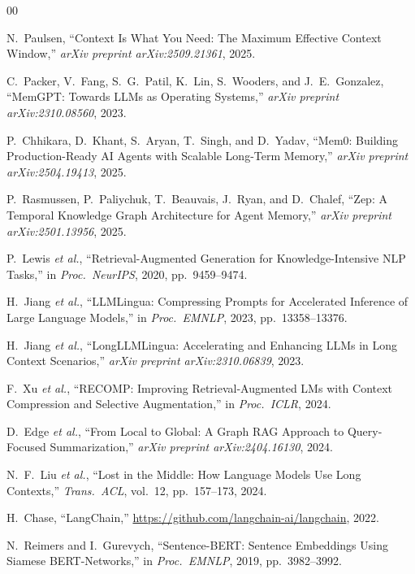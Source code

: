 \documentclass[journal]{IEEEtran}
\begin{document}
\balance
\begin{thebibliography}{00}

N.~Paulsen, ``Context Is What You Need: The Maximum Effective
Context Window,'' \emph{arXiv preprint arXiv:2509.21361}, 2025.

C.~Packer, V.~Fang, S.~G.~Patil, K.~Lin, S.~Wooders, and
J.~E.~Gonzalez, ``MemGPT: Towards LLMs as Operating
Systems,'' \emph{arXiv preprint arXiv:2310.08560}, 2023.

P.~Chhikara, D.~Khant, S.~Aryan, T.~Singh, and D.~Yadav,
``Mem0: Building Production-Ready AI Agents with Scalable
Long-Term Memory,'' \emph{arXiv preprint arXiv:2504.19413}, 2025.

P.~Rasmussen, P.~Paliychuk, T.~Beauvais, J.~Ryan, and
D.~Chalef, ``Zep: A Temporal Knowledge Graph Architecture for
Agent Memory,'' \emph{arXiv preprint arXiv:2501.13956}, 2025.

P.~Lewis \emph{et al.}, ``Retrieval-Augmented Generation for
Knowledge-Intensive NLP Tasks,'' in \emph{Proc.\ NeurIPS},
2020, pp.\ 9459--9474.

H.~Jiang \emph{et al.}, ``LLMLingua: Compressing Prompts for
Accelerated Inference of Large Language Models,'' in
\emph{Proc.\ EMNLP}, 2023, pp.\ 13358--13376.

H.~Jiang \emph{et al.}, ``LongLLMLingua: Accelerating and
Enhancing LLMs in Long Context Scenarios,''
\emph{arXiv preprint arXiv:2310.06839}, 2023.

F.~Xu \emph{et al.}, ``RECOMP: Improving Retrieval-Augmented
LMs with Context Compression and Selective Augmentation,''
in \emph{Proc.\ ICLR}, 2024.

D.~Edge \emph{et al.}, ``From Local to Global: A Graph
RAG Approach to Query-Focused Summarization,''
\emph{arXiv preprint arXiv:2404.16130}, 2024.

N.~F.~Liu \emph{et al.}, ``Lost in the Middle: How Language
Models Use Long Contexts,'' \emph{Trans.\ ACL}, vol.\ 12,
pp.\ 157--173, 2024.

H.~Chase, ``LangChain,''
\url{https://github.com/langchain-ai/langchain}, 2022.

N.~Reimers and I.~Gurevych, ``Sentence-BERT: Sentence
Embeddings Using Siamese BERT-Networks,'' in
\emph{Proc.\ EMNLP}, 2019, pp.\ 3982--3992.


\end{thebibliography}
\end{document}
